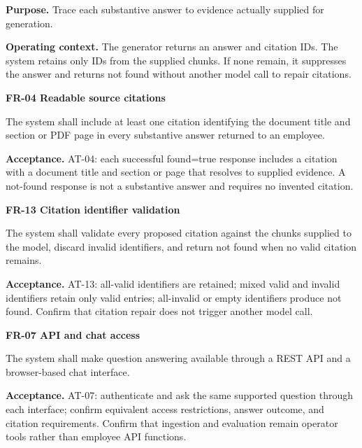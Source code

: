 \documentclass[11pt,letterpaper]{article}
\begin{document}
\textbf{Purpose.} Trace each substantive answer to evidence actually supplied for generation.\par

\textbf{Operating context.} The generator returns an answer and citation IDs. The system retains only IDs from the supplied chunks. If none remain, it suppresses the answer and returns not found without another model call to repair citations.\par


\textbf{FR-04 Readable source citations}\par

The system shall include at least one citation identifying the document title and section or PDF page in every substantive answer returned to an employee.\par

\textbf{Acceptance.} AT-04: each successful found=true response includes a citation with a document title and section or page that resolves to supplied evidence. A not-found response is not a substantive answer and requires no invented citation.\par


\textbf{FR-13 Citation identifier validation}\par

The system shall validate every proposed citation against the chunks supplied to the model, discard invalid identifiers, and return not found when no valid citation remains.\par

\textbf{Acceptance.} AT-13: all-valid identifiers are retained; mixed valid and invalid identifiers retain only valid entries; all-invalid or empty identifiers produce not found. Confirm that citation repair does not trigger another model call.\par


\textbf{FR-07 API and chat access}\par

The system shall make question answering available through a REST API and a browser-based chat interface.\par

\textbf{Acceptance.} AT-07: authenticate and ask the same supported question through each interface; confirm equivalent access restrictions, answer outcome, and citation requirements. Confirm that ingestion and evaluation remain operator tools rather than employee API functions.\par
\end{document}

